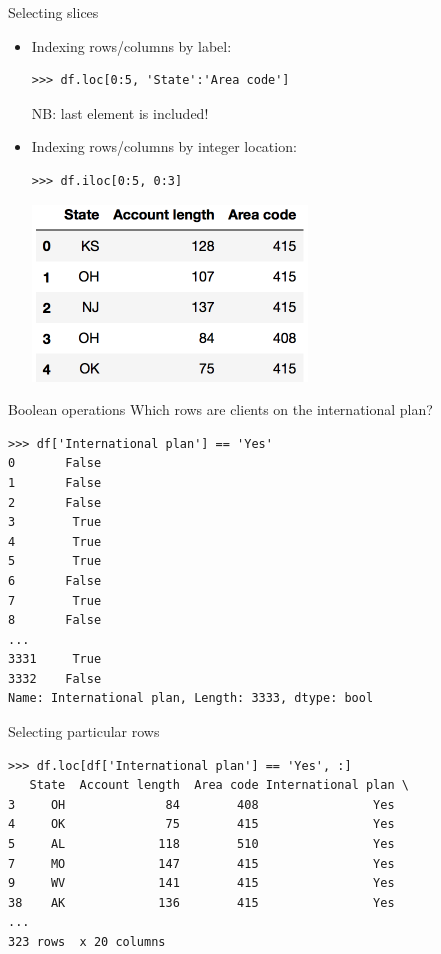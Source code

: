 \documentclass[aspectratio=169,usenames,dvipsnames]{beamer}
\begin{document}
\begin{frame}[fragile]{Selecting slices}
    \begin{itemize}
        \item Indexing rows/columns by label:
\begin{lstlisting}
>>> df.loc[0:5, 'State':'Area code']
\end{lstlisting}

            NB: last element is included!

        \item Indexing rows/columns by integer location:

\begin{lstlisting}
>>> df.iloc[0:5, 0:3]
\end{lstlisting}

            \includegraphics[height=0.3\textheight]{fig/telecomslice}
    \end{itemize}
\end{frame}

\begin{frame}[fragile]{Boolean operations}
Which rows are clients on the international plan?

\begin{lstlisting}
>>> df['International plan'] == 'Yes'
0       False
1       False
2       False
3        True
4        True
5        True
6       False
7        True
8       False
...
3331     True
3332    False
Name: International plan, Length: 3333, dtype: bool
\end{lstlisting}
\end{frame}

\begin{frame}[fragile]{Selecting particular rows}
\begin{lstlisting}
>>> df.loc[df['International plan'] == 'Yes', :]
   State  Account length  Area code International plan \
3     OH              84        408                Yes
4     OK              75        415                Yes
5     AL             118        510                Yes
7     MO             147        415                Yes
9     WV             141        415                Yes
38    AK             136        415                Yes
...
323 rows  x 20 columns
\end{lstlisting}
\end{frame}
\end{document}
